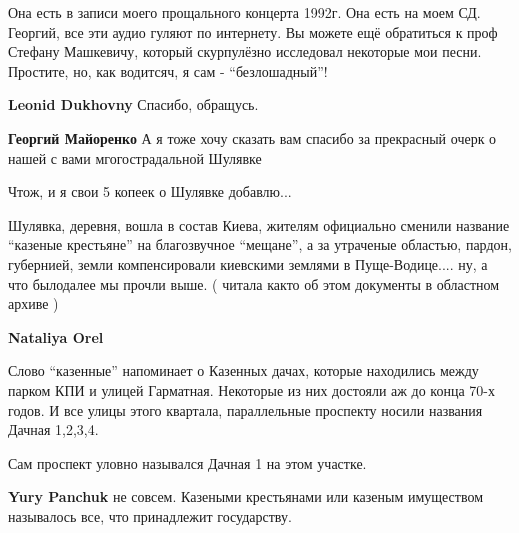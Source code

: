 \begin{itemize}
\begin{itemize}

Она есть в записи моего прощального концерта 1992г. Она есть на моем СД.
Георгий, все эти аудио гуляют по интернету. Вы можете ещё обратиться к проф
Стефану Машкевичу, который скурпулёзно исследовал некоторые мои песни.
Простите, но, как водитсяч, я сам - \enquote{безлошадный}!

\begin{itemize} %
\textbf{Leonid Dukhovny} Спасибо, обращусь.

\textbf{Георгий Майоренко} А я тоже хочу сказать вам спасибо за прекрасный очерк о нашей с вами мгогострадальной Шулявке
\end{itemize} %


\end{itemize} %


Чтож, и я свои 5 копеек о Шулявке добавлю...

Шулявка, деревня, вошла в состав Киева, жителям официально сменили название
\enquote{казеные крестьяне} на благозвучное \enquote{мещане}, а за утраченые
областью, пардон, губернией, земли компенсировали киевскими землями в
Пуще-Водице.... ну, а что былодалее мы прочли выше. ( читала както об этом
документы в областном архиве )

\begin{itemize} %
\textbf{Nataliya Orel} 

Слово \enquote{казенные} напоминает о Казенных дачах, которые находились между парком
КПИ и улицей Гарматная. Некоторые из них достояли аж до конца 70-х годов. И все
улицы этого квартала, параллельные проспекту носили названия Дачная 1,2,3,4.

Сам проспект уловно назывался Дачная 1 на этом участке.

\textbf{Yury Panchuk} не совсем. Казеными крестьянами или казеным имуществом называлось все, что принадлежит государству.
\end{itemize} %



\end{itemize} %
